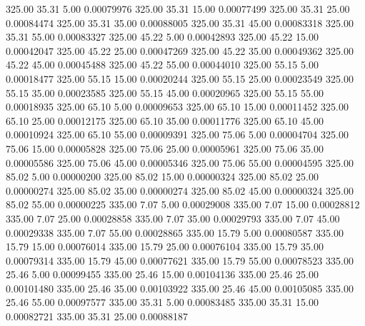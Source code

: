     325.00     35.31      5.00     0.00079976
    325.00     35.31     15.00     0.00077499
    325.00     35.31     25.00     0.00084474
    325.00     35.31     35.00     0.00088005
    325.00     35.31     45.00     0.00083318
    325.00     35.31     55.00     0.00083327
    325.00     45.22      5.00     0.00042893
    325.00     45.22     15.00     0.00042047
    325.00     45.22     25.00     0.00047269
    325.00     45.22     35.00     0.00049362
    325.00     45.22     45.00     0.00045488
    325.00     45.22     55.00     0.00044010
    325.00     55.15      5.00     0.00018477
    325.00     55.15     15.00     0.00020244
    325.00     55.15     25.00     0.00023549
    325.00     55.15     35.00     0.00023585
    325.00     55.15     45.00     0.00020965
    325.00     55.15     55.00     0.00018935
    325.00     65.10      5.00     0.00009653
    325.00     65.10     15.00     0.00011452
    325.00     65.10     25.00     0.00012175
    325.00     65.10     35.00     0.00011776
    325.00     65.10     45.00     0.00010924
    325.00     65.10     55.00     0.00009391
    325.00     75.06      5.00     0.00004704
    325.00     75.06     15.00     0.00005828
    325.00     75.06     25.00     0.00005961
    325.00     75.06     35.00     0.00005586
    325.00     75.06     45.00     0.00005346
    325.00     75.06     55.00     0.00004595
    325.00     85.02      5.00     0.00000200
    325.00     85.02     15.00     0.00000324
    325.00     85.02     25.00     0.00000274
    325.00     85.02     35.00     0.00000274
    325.00     85.02     45.00     0.00000324
    325.00     85.02     55.00     0.00000225
    335.00      7.07      5.00     0.00029008
    335.00      7.07     15.00     0.00028812
    335.00      7.07     25.00     0.00028858
    335.00      7.07     35.00     0.00029793
    335.00      7.07     45.00     0.00029338
    335.00      7.07     55.00     0.00028865
    335.00     15.79      5.00     0.00080587
    335.00     15.79     15.00     0.00076014
    335.00     15.79     25.00     0.00076104
    335.00     15.79     35.00     0.00079314
    335.00     15.79     45.00     0.00077621
    335.00     15.79     55.00     0.00078523
    335.00     25.46      5.00     0.00099455
    335.00     25.46     15.00     0.00104136
    335.00     25.46     25.00     0.00101480
    335.00     25.46     35.00     0.00103922
    335.00     25.46     45.00     0.00105085
    335.00     25.46     55.00     0.00097577
    335.00     35.31      5.00     0.00083485
    335.00     35.31     15.00     0.00082721
    335.00     35.31     25.00     0.00088187
